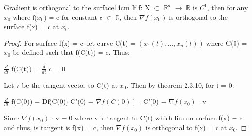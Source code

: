     \begin{wtheorem}{Gradient is orthogonal to the surface}{14cm}
        If f: X $\subset$ $\mathbb{R}^n$ $\rightarrow$ $\mathbb{R}$
        is $C^1$, then for any $x_0$ where f($x_0$) = c for constant
        c $\in$ $\mathbb{R}$, then $\nabla f(x_0)$ is orthogonal
        to the surface f(x) = c at $x_0$.
    \end{wtheorem}

    \begin{proof}
        For surface f(x) = c, let curve C(t) = $(x_1(t),...,x_n(t))$
        where C(0) = $x_0$ be defined such that f(C(t)) = c.
        Thus:

        \hspace{0.5cm}
        $\frac{d}{dt}$ f(C(t))
        = $\frac{d}{dt}$ c = 0

        Let v be the tangent vector to C(t) at $x_0$.
        Then by {\color{red} theorem 2.3.10}, for t = 0:

        \hspace{0.5cm}
        $\frac{d}{dt}$ f(C(0))
        = Df(C(0)) C'(0)
        = $\nabla f(C(0))$ $\cdot$ C'(0)
        = $\nabla f(x_0)$ $\cdot$ v

        Since $\nabla f(x_0)$ $\cdot$ v = 0
        where v is tangent to C(t) which lies on surface f(x) = c and thus,
        is tangent is f(x) = c, then $\nabla f(x_0)$ is orthogonal to f(x) = c
        at $x_0$.
    \end{proof}
















